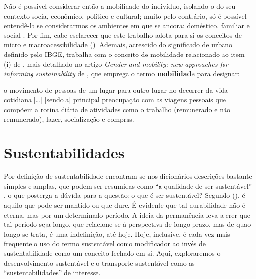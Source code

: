 \clearpage
Não é possível considerar então a mobilidade do indivíduo, isolando-o do seu contexto socia, econômico, político e cultural; muito pelo contrário, só é possível entendê-lo se considerarmos os ambientes em que se ancora: doméstico, familiar e social \cite{HANSON2010}. Por fim, cabe esclarecer que este trabalho adota para si os conceitos de micro e macroacessibilidade  (\citeyear{VASCONCELLOS2001}). Ademais, acrescido do significado de urbano definido pelo IBGE, trabalha com o conceito de mobilidade relacionado ao item (i) de , mais detalhado no artigo \emph{Gender and mobility: new approaches for informing sustainability} de , que emprega o termo \textbf{mobilidade} para designar:

\begin{citacao}
o movimento de pessoas de um lugar para outro lugar no decorrer da vida cotidiana [\ldots] [sendo a] principal preocupação com as viagens pessoais que compõem a rotina diária de atividades como o trabalho (remunerado e não remunerado), lazer, socialização e compras.
\cite[p.7]{HANSON2010}
\end{citacao} 


\clearpage
\section{Sustentabilidades}

Por definição de sustentabilidade encontram-se nos dicionários descrições bastante simples e amplas, que podem ser resumidas como ``a qualidade de ser sustentável'' \cite{MICHAELIS2014}, o que posterga a dúvida para a questão: o que é ser sustentável? Segundo  (\citeyear{BLACK2010}), é aquilo que pode ser mantido ou que dure. É evidente que tal durabilidade não é eterna, mas por um determinado período. A ideia da permanência leva a crer que tal período seja longo, que relacione-se à perspectiva de longo prazo, mas de quão longo se trata, é uma indefinição, até hoje. Hoje, inclusive, é cada vez mais frequente o uso do termo sustentável como modificador ao invés de sustentabilidade como um conceito fechado em si. Aqui, exploraremos o desenvolvimento  sustentável e o transporte sustentável como as ``sustentabilidades'' de interesse.

